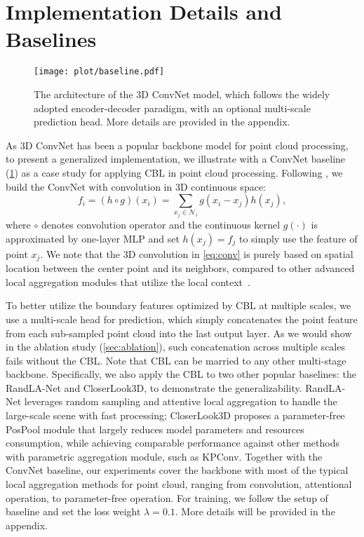 \documentclass[10pt,twocolumn,letterpaper]{article}
\newcommand{\tly}{}
\begin{document}
\section{Implementation Details and Baselines}
\begin{figure}
\begin{center}
  \texttt{[image: plot/baseline.pdf]}
\end{center}
   \caption{The architecture of the 3D ConvNet model, which follows the widely adopted encoder-decoder paradigm, with an optional multi-scale prediction head. More details are provided in the appendix.}
\label{fig:baseline}
\end{figure}
\label{sec:method:arch}
As 3D ConvNet has been a popular backbone model for point cloud processing, to present a generalized implementation, we illustrate with a ConvNet baseline (\cref{fig:baseline}) as a case study for applying CBL in point cloud processing.
Following \cite{convpoints, mtconv}, we build the ConvNet with convolution in 3D continuous space:
\begin{equation}
	\displaystyle
	f_i = ( h\circ g)(x_i) = \sum_{x_j\in\mathcal N_i} g(x_i-x_j) h(x_j),
	\label{eq:conv}
\end{equation}
where $\circ$ denotes convolution operator and the continuous kernel $g(\cdot)$ is approximated by one-layer MLP and set $h(x_j) = f_j$ to simply use the feature of point $x_j$. We note that the 3D convolution in \cref{eq:conv} is purely based on spatial location between the center point and its neighbors, compared to other advanced local aggregation modules that utilize the local context~\cite{randlanet, pttransformer}.

To better utilize the boundary features optimized by CBL at multiple scales, we use a multi-scale head for prediction, which simply concatenates the point feature from each sub-sampled point cloud into the last output layer. As we would show in the ablation study (\cref{sec:ablation}), such concatenation across multiple scales fails without the CBL. Note that CBL can be married to any other multi-stage backbone. Specifically, we also apply the CBL to two other popular baselines: the RandLA-Net\cite{randlanet} and CloserLook3D\cite{closerlook}, to demonstrate the generalizability. RandLA-Net leverages random sampling and attentive local aggregation to handle the large-scale scene with fast processing; CloserLook3D proposes a parameter-free PosPool module that largely reduces model parameters and resources consumption, while achieving comparable performance against other methods with parametric aggregation module, such as KPConv\cite{kpconv}. Together with the ConvNet baseline, our experiments cover the backbone with most of the typical local aggregation methods {\tly for} point cloud, ranging from convolution, attentional operation, to parameter-free operation.
{\tly For training, we follow the setup of baseline and set the loss weight $\lambda=0.1$. More details will be provided in the appendix.}
\end{document}
